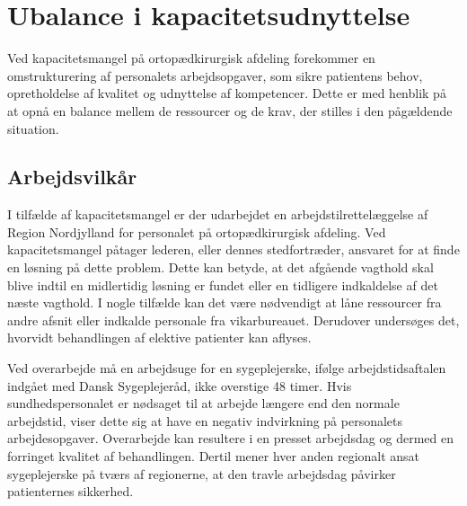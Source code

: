 \section{Ubalance i kapacitetsudnyttelse}
Ved kapacitetsmangel på ortopædkirurgisk afdeling forekommer en omstrukturering af personalets arbejdsopgaver, som sikre patientens behov, opretholdelse af kvalitet og udnyttelse af kompetencer. Dette er med henblik på at opnå en balance mellem de ressourcer og de krav, der stilles i den pågældende situation.\cite{Bjerg2016}  %

\subsection{Arbejdsvilkår} \label{Per_sik}

I tilfælde af kapacitetsmangel er der udarbejdet en arbejdstilrettelæggelse af Region Nordjylland for personalet på ortopædkirurgisk afdeling. Ved kapacitetsmangel påtager lederen, eller dennes stedfortræder, ansvaret for at finde en løsning på dette problem. Dette kan betyde, at det afgående vagthold skal blive indtil en midlertidig løsning er fundet eller en tidligere indkaldelse af det næste vagthold. I nogle tilfælde kan det være nødvendigt at låne ressourcer fra andre afsnit eller indkalde personale fra vikarbureauet. Derudover undersøges det, hvorvidt behandlingen af elektive patienter kan aflyses.\cite{Bjerg2016} 

Ved overarbejde må en arbejdsuge for en sygeplejerske, ifølge arbejdstidsaftalen indgået med Dansk Sygeplejeråd, ikke overstige 48 timer\cite{Danske2015}.  Hvis sundhedspersonalet er nødsaget til at arbejde længere end den normale arbejdstid, viser dette sig at have en negativ indvirkning på personalets arbejdesopgaver\cite{Dinges2004}. Overarbejde kan resultere i en presset arbejdsdag og dermed en forringet kvalitet af behandlingen\cite{Kjeldsen2015}. Dertil mener hver anden regionalt ansat sygeplejerske på tværs af regionerne, at den travle arbejdsdag påvirker patienternes sikkerhed\cite{Kjeldsen2015}.



